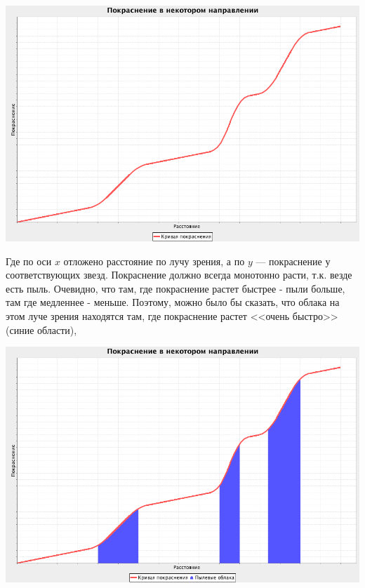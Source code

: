 \documentclass[14pt]{article}
\begin{document}
        		\begin{center}
        			\includegraphics[scale=0.3]{../../presentation/ideal-1-no-tick.png}
			\end{center}        		
        		
        		Где по оси $x$ отложено расстояние по лучу зрения, а по $y$ --- покраснение у соответствующих звезд. Покраснение должно всегда монотонно расти, т.к. везде есть пыль.  Очевидно, что там, где покраснение растет быстрее - пыли больше, там где медленнее - меньше. Поэтому, можно было бы сказать, что облака на этом луче зрения находятся там, где покраснение растет <<очень быстро>> (синие области),   
           
            \begin{center}
           		\includegraphics[scale=0.3]{../../presentation/ideal-2-no-tick.png}    
			\end{center}        
        
\end{document}
